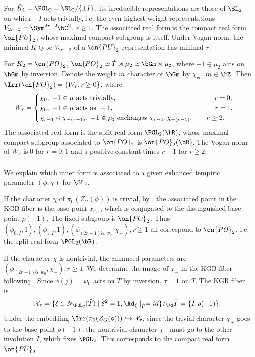\documentclass[12pt]{amsart}
\theoremstyle{remark}
\begin{document}
For $\check K_1=\PGL_2=\SL_2/\{\pm I\}$, 
its irreducible representations are those of $\SL_2$
on which $-I$ acts trivially, i.e. the even highest weight representations $V_{2r-2}=\Sym^{2r-2}\bC^2$, $r\geq1$.
The associated real form is the compact real form 
$\on{PU}_2$, whose maximal compact subgroup is itself.
Under Vogan norm, the minimal $K$-type $V_{2r-2}$ of 
a $\on{PU}_2$-representation has minimal $r$.

For $\check K_2=\on{PO}_2$, 
$\on{PO}_2\simeq\check T\rtimes\mu_2\simeq\bGm\rtimes\mu_2$,
where $-1\in\mu_2$ acts on $\bGm$ by inversion.
Denote the weight $m$ character of $\bGm$ by $\chi_m$, $m\in\bZ$.
Then $\Irr(\on{PO}_2)=\{W_r,r\geq 0\}$, where
\[
W_r=\begin{cases}
    \chi_0,\ -1\in\mu\text{ acts trivially},\hspace{5cm} r=0,\\
    \chi_0,\ -1\in\mu\text{ acts as }-1,\hspace{5.2cm} r=1,\\
    \chi_{r-1}\oplus\chi_{-(r-1)},\ -1\in\mu_2\text{ exchanges }\chi_{r-1},\chi_{-(r-1)},\qquad r\geq 2.
\end{cases}
\]
The associated real form is the split real form
$\PGL_2(\bR)$, whose maximal compact subgroup associated to $\on{PO}_2$ is $\on{PO}_2(\bR)$.
The Vogan norm of $W_r$ is $0$ for $r=0,1$ and a positive constant times $r-1$ for $r\geq 2$.

\subsubsection{}
We explain which inner form is associated to 
a given enhanced tempiric parameter $(\phi,\chi)$ for $\SL_2$.

If the character $\chi$ of $\pi_0(Z_G(\phi))$ is trivial,
by \cite[Proposition 4.12]{AA},
the associated point in the KGB fiber is the base point $x_{b,\tau}$, which is conjugated to the distinguished base point
$\rho(-1)$.
The fixed subgroup is $\on{PO}_2$.
Thus $(\phi_{0,I},1),(\phi_{1,I},1),(\phi_{(2r-1)\check\alpha,w_0},\chi_+),r\geq 1$
all correspond to $\on{PO}_2$,
i.e. the split real form $\PGL_2(\bR)$.

If the character $\chi$ is nontrivial, 
the enhanced parameters are $(\phi_{(2r-1)\check\alpha,w_0},\chi_-),r\geq 1$.
We determine the image of $\chi_-$ in the KGB fiber
following \cite[\S4.3]{AA}.
Since $\phi(j)=w_0$ acts on $T$ by inversion,
$\tau=1$ on $\check T$.
The KGB fiber is
\[
\mathcal{X}_\tau
=\{\xi\in N_{\PGL_2}(\check T)\mid \xi^2=1,\Ad_\xi\mid_{\check T}=id\}/_{\Ad}\check{T}
=\{I,\rho(-1)\}.
\]
Under the embedding $\Irr(\pi_0(Z_G(\phi)))\hookrightarrow\mathcal{X}_\tau$,
since the trivial character $\chi_+$ goes to the base point $\rho(-1)$,
the nontrivial character $\chi_-$ must go to the other involution $I$, which fixes $\PGL_2$.
This corresponds to the compact real form $\on{PU}_2$.
\end{document}
